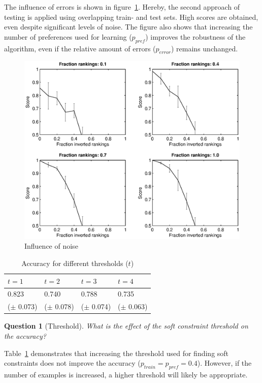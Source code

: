 \documentclass[letterpaper]{article}
\newtheorem{question}{Question}
\theoremstyle{definition}
\begin{document}
The influence of errors is shown in figure~\ref{fig:ruis}.
Hereby, the second approach of testing is applied using overlapping train- and test sets.
High scores are obtained, even despite significant levels of noise.
The figure also shows that increasing the number of preferences used for learning ($p_{pref}$) improves the robustness of the algorithm, even if the relative amount of errors ($p_{error}$) remains unchanged.

\begin{figure}
  \centering
    \includegraphics[width=1.1\linewidth]{noise}
  \caption{Influence of noise}
  \label{fig:ruis}
\end{figure}

  \begin{table}[!htp]
    \caption{Accuracy for different thresholds ($t$)}
    \begin{tabularx}{\linewidth}{XXXX}
      $t = 1$ & $t = 2$ & $t = 3$ & $t = 4$ \\
      \toprule
     0.823 & 0.740 & 0.788 & 0.735 \\
     ($\pm$ 0.073)&
($\pm$ 0.078)&
($\pm$ 0.074)&
($\pm$ 0.063)
    \end{tabularx}
    \label{tbl:limiet}
  \end{table}

\begin{question}[Threshold]
  What is the effect of the soft constraint threshold on the accuracy?
\end{question}

Table~\ref{tbl:limiet} demonstrates that increasing the threshold used for finding soft constraints does not improve the accuracy ($p_{train} = p_{pref} = 0.4$).
However, if the number of examples is increased, a higher threshold will likely be appropriate.
\end{document}
